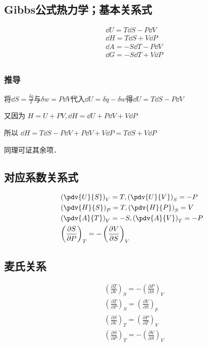 

\subsection{Gibbs公式热力学；基本关系式}
\begin{align}
&\dd U = T \dd S - P \dd V\\
&\dd H = T \dd S + V \dd P\\
&\dd A = -S \dd T - P \dd V\\
&\dd G = -S \dd T +V \dd P\\
\end{align}

\subsubsection{推导}
将$\dd S = \frac{\delta q}{T}$与$\delta w = P\dd V$代入$\dd U=\delta q-\delta w$得$\dd U = T \dd S - P \dd V$

又因为 $H=U+PV, \dd H = \dd U + P \dd V + V \dd P$

所以 $\dd H = T \dd S - P \dd V+ P \dd V + V \dd P = T \dd S + V \dd P$

同理可证其余项．
\subsection{对应系数关系式}
\begin{align}
&\left(\pdv{U}{S}\right)_V=T, \left(\pdv{U}{V}\right)_S=-P
\\
&\left(\pdv{H}{S}\right)_P=T, \left(\pdv{H}{P}\right)_S=V
\\
&\left(\pdv{A}{T}\right)_V=-S, \left(\pdv{A}{V}\right)_T=-P
\\
&\left(\frac{\partial S}{\partial P}\right)_T=-\left(\frac{\partial V}{\partial S}\right)_V
\end{align}


\subsection{麦氏关系}

\begin{align}
&\left(\frac{\partial T}{\partial V}\right)_S=-\left(\frac{\partial P}{\partial S}\right)_V\label{MWRel_eq1}
\\
&\left(\frac{\partial T}{\partial P}\right)_S=\left(\frac{\partial V}{\partial S}\right)_p
\\
&\left(\frac{\partial S}{\partial V}\right)_T=\left(\frac{\partial P}{\partial T}\right)_V
\\
&\left(\frac{\partial S}{\partial P}\right)_T=-\left(\frac{\partial V}{\partial S}\right)_V
\end{align}

